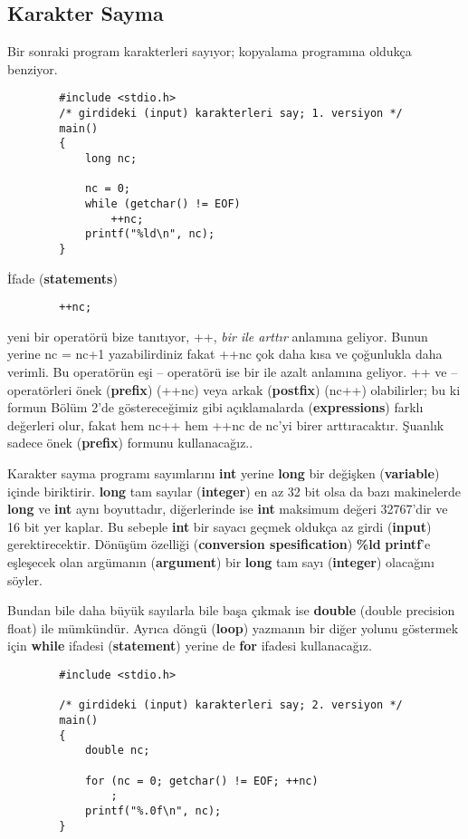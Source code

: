 \documentclass[a4paper,12pt,oneside]{book}
\begin{document}
\subsection{Karakter Sayma}

Bir sonraki program karakterleri sayıyor; kopyalama programına oldukça benziyor.
\begin{lstlisting}
		#include <stdio.h>
		/* girdideki (input) karakterleri say; 1. versiyon */
		main()
		{
			long nc;

			nc = 0;
			while (getchar() != EOF)
				++nc;
			printf("%ld\n", nc);
		}
\end{lstlisting}
\par İfade (\textbf{statements})
\begin{lstlisting}
		++nc;
\end{lstlisting}
yeni bir operatörü bize tanıtıyor, ++, \textit{bir ile arttır} anlamına geliyor. Bunun yerine nc = nc+1 yazabilirdiniz fakat ++nc çok daha kısa ve çoğunlukla daha verimli. Bu operatörün eşi -- operatörü ise bir ile azalt anlamına geliyor. ++ ve -- operatörleri önek (\textbf{prefix}) (++nc) veya arkak (\textbf{postfix}) (nc++) olabilirler; bu ki formun Bölüm 2'de göstereceğimiz gibi açıklamalarda (\textbf{expressions}) farklı değerleri olur, fakat hem nc++ hem ++nc de nc'yi birer arttıracaktır. Şuanlık sadece önek (\textbf{prefix}) formunu kullanacağız..
\par Karakter sayma programı sayımlarını \textbf{int} yerine \textbf{long} bir değişken (\textbf{variable}) içinde biriktirir. \textbf{long} tam sayılar (\textbf{integer}) en az 32 bit olsa da bazı makinelerde \textbf{long} ve \textbf{int} aynı boyuttadır, diğerlerinde ise \textbf{int} maksimum değeri 32767'dir ve 16 bit yer kaplar. Bu sebeple \textbf{int} bir sayacı geçmek oldukça az girdi (\textbf{input}) gerektirecektir. Dönüşüm özelliği (\textbf{conversion spesification}) \textbf{\%ld} \textbf{printf}'e eşleşecek olan argümanın (\textbf{argument}) bir \textbf{long} tam sayı (\textbf{integer}) olacağını söyler.
\par Bundan bile daha büyük sayılarla bile başa çıkmak ise \textbf{double} (double precision float) ile mümkündür. Ayrıca döngü (\textbf{loop}) yazmanın bir diğer yolunu göstermek için \textbf{while} ifadesi (\textbf{statement}) yerine de \textbf{for} ifadesi kullanacağız.
\begin{lstlisting}
		#include <stdio.h>

		/* girdideki (input) karakterleri say; 2. versiyon */
		main()
		{
			double nc;

			for (nc = 0; getchar() != EOF; ++nc)
				;
			printf("%.0f\n", nc);
		}
\end{lstlisting}
\end{document}
